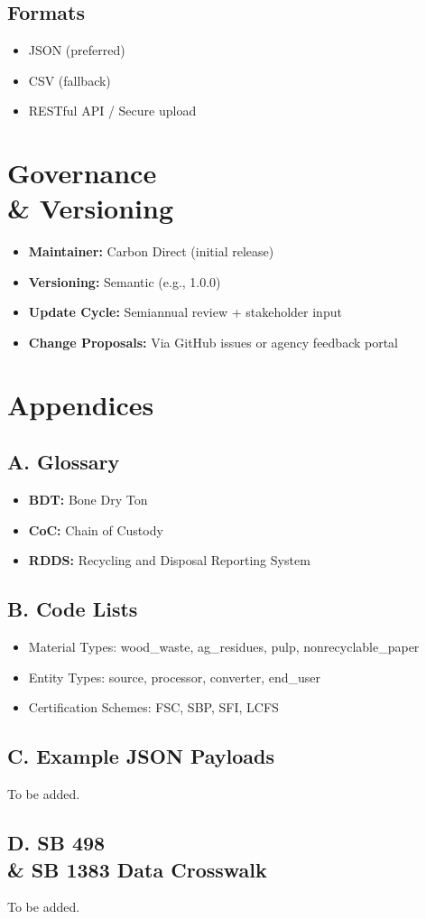 \documentclass{article}
\begin{document}
\subsection*{Formats}
\begin{itemize}[noitemsep]
    \item JSON (preferred)
    \item CSV (fallback)
    \item RESTful API / Secure upload
\end{itemize}

\section{Governance \\& Versioning}
\begin{itemize}[noitemsep]
    \item \textbf{Maintainer:} Carbon Direct (initial release)
    \item \textbf{Versioning:} Semantic (e.g., 1.0.0)
    \item \textbf{Update Cycle:} Semiannual review + stakeholder input
    \item \textbf{Change Proposals:} Via GitHub issues or agency feedback portal
\end{itemize}

\section{Appendices}
\subsection*{A. Glossary}
\begin{itemize}[noitemsep]
    \item \textbf{BDT:} Bone Dry Ton
    \item \textbf{CoC:} Chain of Custody
    \item \textbf{RDDS:} Recycling and Disposal Reporting System
\end{itemize}

\subsection*{B. Code Lists}
\begin{itemize}[noitemsep]
    \item Material Types: wood\_waste, ag\_residues, pulp, nonrecyclable\_paper
    \item Entity Types: source, processor, converter, end\_user
    \item Certification Schemes: FSC, SBP, SFI, LCFS
\end{itemize}

\subsection*{C. Example JSON Payloads}
To be added.

\subsection*{D. SB 498 \\& SB 1383 Data Crosswalk}
To be added.
\end{document}
